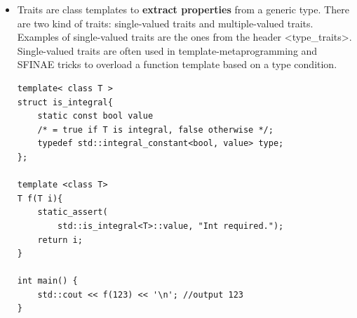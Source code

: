\documentclass[a4paper,11pt,twoside]{book}
\begin{document}
\begin{itemize}
	\item Traits are class templates to \textbf{extract properties} from a generic type. There are two kind of traits: single-valued traits and multiple-valued traits. Examples of single-valued traits are the ones from the header <type\_traits>. Single-valued traits are often used in template-metaprogramming and SFINAE tricks to overload a function template based on a type condition.
	\begin{lstlisting}[numbers=none]
template< class T >
struct is_integral{
	static const bool value
	/* = true if T is integral, false otherwise */;
	typedef std::integral_constant<bool, value> type;
};
	
template <class T>
T f(T i){
	static_assert(
		std::is_integral<T>::value, "Int required.");
	return i;
}

int main() {
	std::cout << f(123) << '\n'; //output 123
}
\end{lstlisting}
\end{itemize}
\end{document}
